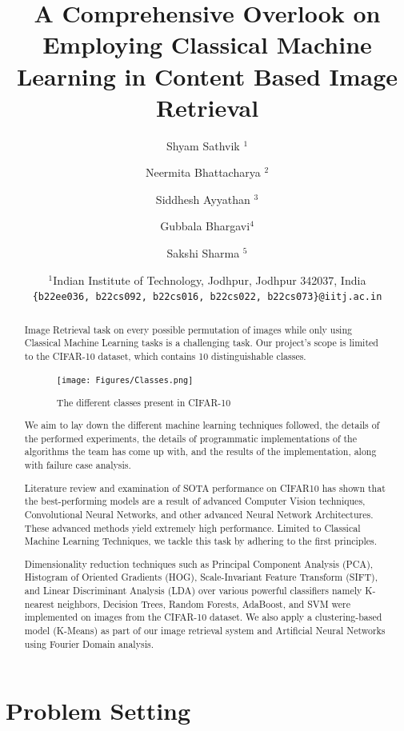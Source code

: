 \documentclass[a4paper]{article}
\title{A Comprehensive Overlook on Employing Classical Machine Learning in Content Based Image Retrieval}
\author{Shyam Sathvik $^1$ \and Neermita Bhattacharya $^2$ \and Siddhesh Ayyathan  $^3$ \and Gubbala Bhargavi$^4$ \and Sakshi Sharma $^5$  }
\date{
	$^1$Indian Institute of Technology, Jodhpur, Jodhpur 342037, India \\ \texttt{\{b22ee036, b22cs092, b22cs016, b22cs022, b22cs073\}@iitj.ac.in}\\%
}
\theoremstyle{plain}
\theoremstyle{definition}
\begin{document}
	\maketitle
	
	\begin{abstract}
		\noindent Image Retrieval task on every possible permutation of images while only using Classical Machine Learning tasks is a challenging task. Our project's scope is limited to the CIFAR-10 dataset, which contains 10 distinguishable classes. 
        \begin{figure}
            \centering
            \texttt{[image: Figures/Classes.png]}
            \caption{The different classes present in CIFAR-10}
            \label{fig:enter-label}
        \end{figure}
    We aim to lay down the different machine learning techniques followed, the details of the performed experiments, the details of programmatic implementations of the algorithms the team has come up with, and the results of the implementation, along with failure case analysis.
    
    \noindent 
    Literature review and examination of SOTA performance on CIFAR10 has shown that the best-performing models are a result of advanced Computer Vision techniques, Convolutional Neural Networks, and other advanced Neural Network Architectures. These advanced methods yield extremely high performance. Limited to Classical Machine Learning Techniques, we tackle this task by adhering to the first principles.

    \noindent 
    Dimensionality reduction techniques such as Principal Component Analysis (PCA), Histogram of Oriented Gradients (HOG), Scale-Invariant Feature Transform (SIFT), and Linear Discriminant Analysis (LDA) over various powerful classifiers namely K-nearest neighbors, Decision Trees, Random Forests, AdaBoost, and SVM were implemented on images from the CIFAR-10 dataset. We also apply a clustering-based model (K-Means) as part of our image retrieval system and Artificial Neural Networks using Fourier Domain analysis.

    
    
		\vspace{10cm}	
	\end{abstract}

\tableofcontents
\newpage
\section{Problem Setting}
\label{sec:intro}
\end{document}
